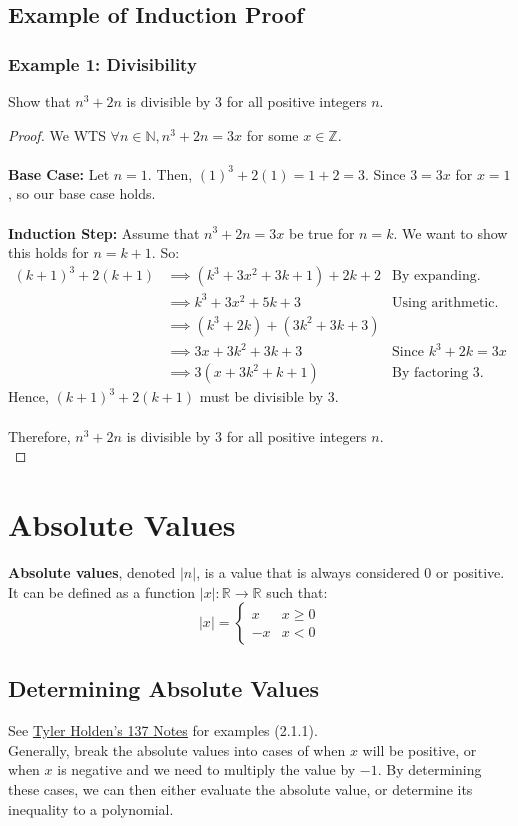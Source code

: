 \documentclass{article}
\begin{document}
\subsection{Example of Induction Proof}
\subsubsection{Example 1: Divisibility}
Show that $n^3 + 2n$ is divisible by $3$ for all positive integers $n$.
\begin{proof}
We WTS $\forall n \in \mathbb{N}, n^3 + 2n = 3x$ for some $x \in \mathbb{Z}$.\\
\\
\textbf{Base Case: }Let $n = 1$. Then, $(1)^3 + 2(1) = 1 + 2 = 3$. Since $3 = 3x$ for $x = 1$, so our base case holds.\\
\\
\textbf{Induction Step: }Assume that $n^3 + 2n = 3x$ be true for $n = k$. We want to show this holds for $n = k + 1$. So:
\begin{align*}
    (k + 1)^3 + 2(k + 1) & \implies (k^3 + 3x^2 + 3k + 1) + 2k + 2 & \text{By expanding.}\\
    & \implies k^3 + 3x^2 + 5k + 3 & \text{Using arithmetic.}\\
    & \implies (k^3 + 2k) + (3k^2 + 3k + 3)\\
    & \implies 3x + 3k^2 + 3k + 3 & \text{Since }k^3 + 2k = 3x\\
    & \implies 3(x + 3k^2 + k + 1) & \text{By factoring 3.}
\end{align*}
Hence, $(k+1)^3 + 2(k+1)$ must be divisible by 3. \\
\\
Therefore, $n^3 + 2n$ is divisible by $3$ for all positive integers $n$.\\
\end{proof}
\section{Absolute Values}
\textbf{Absolute values}, denoted $|n|$, is a value that is always considered 0 or positive.\\
It can be defined as a function $|x|: \mathbb{R} \to \mathbb{R}$ such that: 
$$|x| = \begin{cases}
x & x\geq 0\\
-x & x < 0
\end{cases}$$
\subsection{Determining Absolute Values}
See \hyperlink{http://home.tykenho.com/LectureNotes137_Preview.pdf}{Tyler Holden's 137 Notes} for examples (2.1.1).\\
Generally, break the absolute values into cases of when $x$ will be positive, or when $x$ is negative and we need to multiply the value by $-1$. By determining these cases, we can then either evaluate the absolute value, or determine its inequality to a polynomial.
\end{document}
